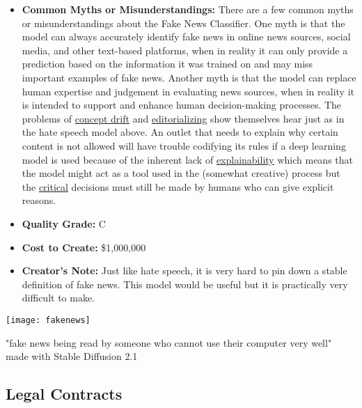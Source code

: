 \begin{itemize}
\begin{itemize}
    \item \textbf{Common Myths or Misunderstandings:} There are a few common myths or misunderstandings about the Fake News Classifier. One myth is that the model can always accurately identify fake news in online news sources, social media, and other text-based platforms, when in reality it can only provide a prediction based on the information it was trained on and may miss important examples of fake news. Another myth is that the model can replace human expertise and judgement in evaluating news sources, when in reality it is intended to support and enhance human decision-making processes. The problems of \hyperref[sec:drift]{concept drift} and \hyperref[sec:janitor]{editorializing} show themselves hear just as in the hate speech model above. An outlet that needs to explain why certain content is not allowed will have trouble codifying its rules if a deep learning model is used because of the inherent lack of \hyperref[sec:explain]{explainability} which means that the model might act as a tool used in the (somewhat creative) process but the \hyperref[sec:creative]{critical} decisions must still be made by humans who can give explicit reasons.
    \item \textbf{Quality Grade:} C
    \item \textbf{Cost to Create:} \$1,000,000
    \item \textbf{Creator's Note:} Just like hate speech, it is very hard to pin down a stable definition of fake news. This model would be useful but it is practically very difficult to make.
\end{itemize}

\begin{marginfigure}[-5.5cm]
        \texttt{[image: fakenews]}
        \caption{"fake news being read by someone who cannot use their computer very well" made with Stable Diffusion 2.1}
\end{marginfigure}

\subsection{Legal Contracts}


\end{itemize}
